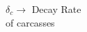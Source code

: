 \documentclass[preview]{standalone}
\begin{document}
\begin{center}
$\delta_c \rightarrow$ Decay Rate\\of carcasses
\end{center}
\end{document}
